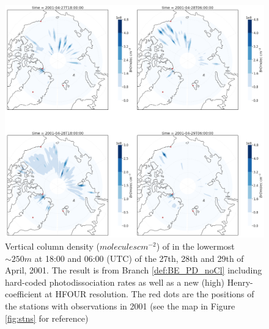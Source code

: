 \begin{figure}[h]
    \centering
    \includegraphics[width=\linewidth]{Chapter6_Results/images/polarBrO_HTWO_step3.png}
    \caption{Vertical column density ($molecules cm^{-2}$) of  in the lowermost $\sim 250 m$ at 18:00 and 06:00 (UTC) of the 27th, 28th and 29th of April, 2001. The result is from  Branch \ref{def:BE_PD_noCl} including hard-coded photodissociation rates as well as a new (high) Henry-coefficient at HFOUR resolution. The red dots are the positions of the stations with observations in 2001 (see the map in Figure \ref{fig:stns} for reference)}
    \label{fig:polarBrO_HTWO_step3}
\end{figure}